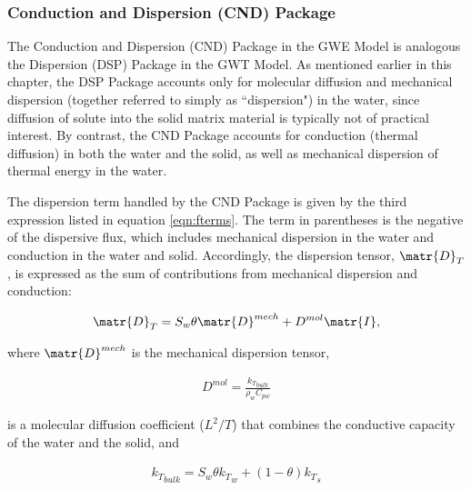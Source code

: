 \subsubsection{Conduction and Dispersion (CND) Package}

The Conduction and Dispersion (CND) Package in the GWE Model is analogous the Dispersion (DSP) Package in the GWT Model. As mentioned earlier in this chapter, the DSP Package accounts only for molecular diffusion and mechanical dispersion (together referred to simply as ``dispersion") in the water, since diffusion of solute into the solid matrix material is typically not of practical interest.  By contrast, the CND Package accounts for conduction (thermal diffusion) in both the water and the solid, as well as mechanical dispersion of thermal energy in the water.

The dispersion term handled by the CND Package is given by the third expression listed in equation \ref{eqn:fterms}. The term in parentheses is the negative of the dispersive flux, which includes mechanical dispersion in the water and conduction in the water and solid. Accordingly, the dispersion tensor, $\matr{D}_T$, is expressed as the sum of contributions from mechanical dispersion and conduction:

\begin{equation}
\label{eqn:dt_tensor}
\begin{aligned}
\matr{D}_T = S_w \theta \matr{D}^{mech} + D^{mol} \matr{I},
\end{aligned}
\end{equation}

\noindent where $\matr{D}^{mech}$ is the mechanical dispersion tensor,

\begin{equation}
\label{eqn:dmolforheat}
\begin{aligned}
D^{mol} = \frac {{k_T}_{bulk}}{\rho_w C_{pw}}
\end{aligned}
\end{equation}

\noindent is a molecular diffusion coefficient ($L^2/T$) that combines the conductive capacity of the water and the solid, and

\begin{equation}
\label{eqn:ktbulk}
\begin{aligned}
{k_T}_{bulk} = S_w \theta {k_T}_w + \left ( 1 - \theta \right ) {k_T}_s
\end{aligned}
\end{equation}

